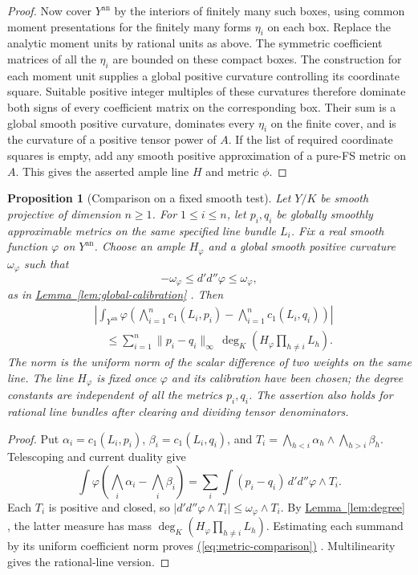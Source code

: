 \documentclass[11pt]{amsart}
\newtheorem{proposition}[theorem]{Proposition}
\theoremstyle{definition}
\theoremstyle{remark}
\numberwithin{equation}{section}
\newcommand{\ddc}{d'd''}
\newcommand{\an}{\mathrm{an}}
\newcommand{\namedref}[2]{%
 \begingroup
 \ifstrequal{#1}{Section}{\hypersetup{linkcolor=sectionteal}}{%
  \ifstrequal{#1}{Appendix}{\hypersetup{linkcolor=sectionteal}}{}}%
 \hyperref[#2]{#1~\ref*{#2}}%
 \endgroup}
\renewcommand{\eqref}[1]{%
 \begingroup\hypersetup{linkcolor=equationviolet}%
 \hyperref[#1]{\textup{(\ref*{#1})}}%
 \endgroup}
\begin{document}
\begin{proof}
Now cover \(Y^\an\) by the interiors of finitely many such boxes,
using common moment presentations for the finitely many forms
\(\eta_i\) on each box. Replace the analytic moment units by
rational units as above. The symmetric coefficient matrices of
all the \(\eta_i\) are bounded on these compact boxes.
The construction for each moment unit supplies a global positive
curvature controlling its coordinate square. Suitable positive
integer multiples of these curvatures therefore dominate both
signs of every coefficient matrix on the corresponding box.
Their sum is a global smooth positive curvature, dominates every
\(\eta_i\) on the finite cover, and is the curvature of a positive
tensor power of \(A\). If the list of required coordinate squares
is empty, add any smooth positive approximation of a pure-FS
metric on \(A\). This gives the asserted ample line \(H\) and
metric \(\phi\).
\end{proof}

\begin{proposition}[Comparison on a fixed smooth test]
\label{prop:metric-comparison}
Let \(Y/K\) be smooth projective of dimension \(n\geq1\). For
\(1\leq i\leq n\), let \(p_i,q_i\) be globally smoothly
approximable metrics on the same specified line bundle \(L_i\).
Fix a real smooth function \(\varphi\) on \(Y^\an\).
Choose an ample \(H_\varphi\) and a global smooth positive
curvature \(\omega_\varphi\) such that
\[
 -\omega_\varphi\leq\ddc\varphi\leq\omega_\varphi,
\]
as in \namedref{Lemma}{lem:global-calibration}. Then
\begin{equation}\label{eq:metric-comparison}
 \begin{split}
 &\left|\int_{Y^\an}\varphi\left(
      \bigwedge_{i=1}^n c_1(L_i,p_i)
       -\bigwedge_{i=1}^n c_1(L_i,q_i)\right)\right|\\
 &\hspace{1em}\leq
  \sum_{i=1}^n\|p_i-q_i\|_\infty\,
      \deg_K\!\left(H_\varphi\prod_{h\ne i}L_h\right).
 \end{split}
\end{equation}
The norm is the uniform norm of the scalar difference of two
weights on the same line. The line \(H_\varphi\) is fixed once
\(\varphi\) and its calibration have been chosen; the degree
constants are independent of all the metrics \(p_i,q_i\).
The assertion also holds for rational line bundles after clearing
and dividing tensor denominators.
\end{proposition}

\begin{proof}
Put \(\alpha_i=c_1(L_i,p_i)\), \(\beta_i=c_1(L_i,q_i)\), and
\(T_i=\bigwedge_{h<i}\alpha_h\wedge\bigwedge_{h>i}\beta_h\).
Telescoping and current duality give
\[
 \int\varphi\left(\bigwedge_i\alpha_i-\bigwedge_i\beta_i\right)
 =\sum_i\int(p_i-q_i)\,\ddc\varphi\wedge T_i.
\]
Each \(T_i\) is positive and closed, so
\(\lvert\ddc\varphi\wedge T_i\rvert\leq\omega_\varphi\wedge T_i\).
By \namedref{Lemma}{lem:degree}, the latter measure has mass
\(\deg_K(H_\varphi\prod_{h\ne i}L_h)\). Estimating each summand by
its uniform coefficient norm proves \eqref{eq:metric-comparison}.
Multilinearity gives the rational-line version.
\end{proof}
\end{document}
